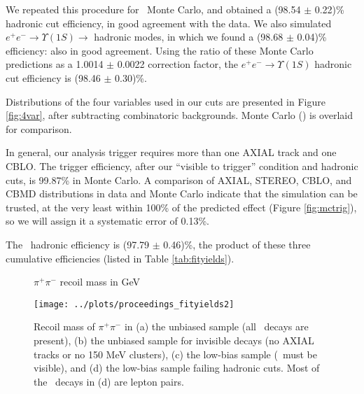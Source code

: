 \documentclass[aps,prd,preprint,superscriptaddress,tightenlines,nofootinbib,floatfix]{revtex4}
\begin{document}
We repeated this procedure for \twotoone\ Monte Carlo, and obtained a
(98.54 $\pm$ 0.22)\% hadronic cut efficiency, in good agreement with
the data.  We also simulated $e^+e^- \to \Upsilon(1S) \to$ hadronic
modes, in which we found a (98.68 $\pm$ 0.04)\% efficiency: also in
good agreement.  Using the ratio of these Monte Carlo predictions as a
1.0014 $\pm$ 0.0022 correction factor, the $e^+e^- \to \Upsilon(1S)$
hadronic cut efficiency is (98.46 $\pm$ 0.30)\%.

Distributions of the four variables used in our cuts are presented in
Figure \ref{fig:4var}, after subtracting combinatoric backgrounds.
Monte Carlo (\twotoone) is overlaid for comparison.

In general, our analysis trigger requires more than one AXIAL track
and one CBLO.  The trigger efficiency, after our ``visible to
trigger'' condition and hadronic cuts, is 99.87\% in Monte Carlo.  A
comparison of AXIAL, STEREO, CBLO, and CBMD distributions in data and
Monte Carlo indicate that the simulation can be trusted, at the very
least within 100\% of the predicted effect (Figure \ref{fig:mctrig}),
so we will assign it a systematic error of 0.13\%.

The \uone\ hadronic efficiency is (97.79 $\pm$ 0.46)\%, the product of
these three cumulative efficiencies (listed in Table
\ref{tab:fityields}).

\begin{figure}[p]
  \vspace{3 cm}
  \begin{center}
    \Large $\pi^+\pi^-$ recoil mass in GeV
  \end{center}

  \vspace{-1.8 cm}
  \begin{center}
    \texttt{[image: ../plots/proceedings\_fityields2]}
  \end{center}
  \caption{\label{fig:recoil} Recoil mass of $\pi^+\pi^-$ in (a) the
    unbiased sample (all \ups\ decays are present), (b) the unbiased
    sample for invisible decays (no AXIAL tracks or no 150 MeV
    clusters), (c) the low-bias sample (\ups\ must be visible), and
    (d) the low-bias sample failing hadronic cuts.  Most of the \uone\
    decays in (d) are lepton pairs.}
\end{figure}
\end{document}
